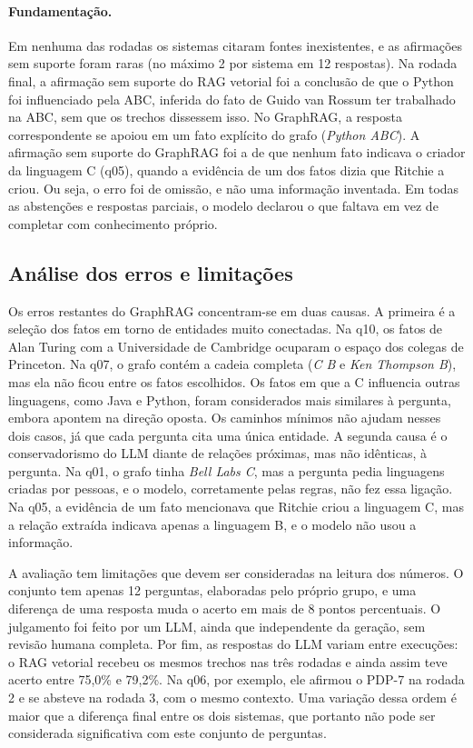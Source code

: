 \paragraph{Fundamentação.} Em nenhuma das rodadas os sistemas citaram fontes inexistentes, e as afirmações sem suporte foram raras (no máximo 2 por sistema em 12 respostas). Na rodada final, a afirmação sem suporte do RAG vetorial foi a conclusão de que o Python foi influenciado pela ABC, inferida do fato de Guido van Rossum ter trabalhado na ABC, sem que os trechos dissessem isso. No GraphRAG, a resposta correspondente se apoiou em um fato explícito do grafo (\emph{Python  ABC}). A afirmação sem suporte do GraphRAG foi a de que nenhum fato indicava o criador da linguagem C (q05), quando a evidência de um dos fatos dizia que Ritchie a criou. Ou seja, o erro foi de omissão, e não uma informação inventada. Em todas as abstenções e respostas parciais, o modelo declarou o que faltava em vez de completar com conhecimento próprio.

\subsection{Análise dos erros e limitações}

Os erros restantes do GraphRAG concentram-se em duas causas. A primeira é a seleção dos fatos em torno de entidades muito conectadas. Na q10, os fatos de Alan Turing com a Universidade de Cambridge ocuparam o espaço dos colegas de Princeton. Na q07, o grafo contém a cadeia completa (\emph{C  B} e \emph{Ken Thompson  B}), mas ela não ficou entre os fatos escolhidos. Os fatos em que a C influencia outras linguagens, como Java e Python, foram considerados mais similares à pergunta, embora apontem na direção oposta. Os caminhos mínimos não ajudam nesses dois casos, já que cada pergunta cita uma única entidade. A segunda causa é o conservadorismo do LLM diante de relações próximas, mas não idênticas, à pergunta. Na q01, o grafo tinha \emph{Bell Labs  C}, mas a pergunta pedia linguagens criadas por pessoas, e o modelo, corretamente pelas regras, não fez essa ligação. Na q05, a evidência de um fato mencionava que Ritchie criou a linguagem C, mas a relação extraída indicava apenas a linguagem B, e o modelo não usou a informação.

A avaliação tem limitações que devem ser consideradas na leitura dos números. O conjunto tem apenas 12 perguntas, elaboradas pelo próprio grupo, e uma diferença de uma resposta muda o acerto em mais de 8 pontos percentuais. O julgamento foi feito por um LLM, ainda que independente da geração, sem revisão humana completa. Por fim, as respostas do LLM variam entre execuções: o RAG vetorial recebeu os mesmos trechos nas três rodadas e ainda assim teve acerto entre 75,0\% e 79,2\%. Na q06, por exemplo, ele afirmou o PDP-7 na rodada 2 e se absteve na rodada 3, com o mesmo contexto. Uma variação dessa ordem é maior que a diferença final entre os dois sistemas, que portanto não pode ser considerada significativa com este conjunto de perguntas.
